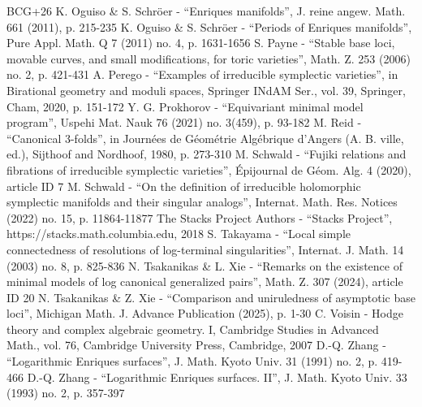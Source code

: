 \documentclass[10pt]{amsart}
\theoremstyle{plain}
\theoremstyle{definition}
\begin{document}
\begin{thebibliography}{BCG+26}
 K. Oguiso \& S. Schröer - “Enriques manifolds”, J. reine angew. Math. 661 (2011), p. 215-235
 K. Oguiso \& S. Schröer - “Periods of Enriques manifolds”, Pure Appl. Math. Q 7 (2011) no. 4, p. 1631-1656
 S. Payne - “Stable base loci, movable curves, and small modifications, for toric varieties”, Math. Z. 253 (2006) no. 2, p. 421-431
 A. Perego - “Examples of irreducible symplectic varieties”, in Birational geometry and moduli spaces, Springer INdAM Ser., vol. 39, Springer, Cham, 2020, p. 151-172
 Y. G. Prokhorov - “Equivariant minimal model program”, Uspehi Mat. Nauk 76 (2021) no. 3(459), p. 93-182
 M. Reid - “Canonical 3-folds”, in Journées de Géométrie Algébrique d’Angers (A. B. ville, ed.), Sijthoof and Nordhoof, 1980, p. 273-310
 M. Schwald - “Fujiki relations and fibrations of irreducible symplectic varieties”, Épijournal de Géom. Alg. 4 (2020), article ID 7
 M. Schwald - “On the definition of irreducible holomorphic symplectic manifolds and their singular analogs”, Internat. Math. Res. Notices (2022) no. 15, p. 11864-11877
 The Stacks Project Authors - “Stacks Project”, https://stacks.math.columbia.edu, 2018
 S. Takayama - “Local simple connectedness of resolutions of log-terminal singularities”, Internat. J. Math. 14 (2003) no. 8, p. 825-836
 N. Tsakanikas \& L. Xie - “Remarks on the existence of minimal models of log canonical generalized pairs”, Math. Z. 307 (2024), article ID 20
 N. Tsakanikas \& Z. Xie - “Comparison and uniruledness of asymptotic base loci”, Michigan Math. J. Advance Publication (2025), p. 1-30
 C. Voisin - Hodge theory and complex algebraic geometry. I, Cambridge Studies in Advanced Math., vol. 76, Cambridge University Press, Cambridge, 2007
 D.-Q. Zhang - “Logarithmic Enriques surfaces”, J. Math. Kyoto Univ. 31 (1991) no. 2, p. 419-466
 D.-Q. Zhang - “Logarithmic Enriques surfaces. II”, J. Math. Kyoto Univ. 33 (1993) no. 2, p. 357-397
\end{thebibliography}
\end{document}
